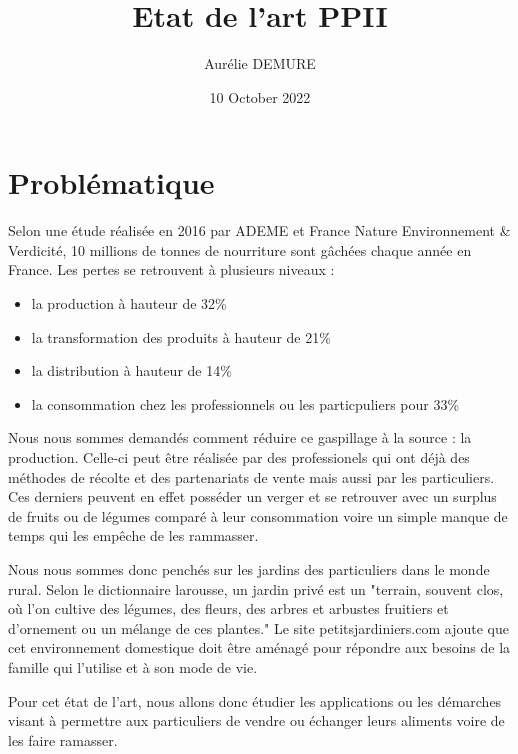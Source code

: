\documentclass{article}
\title{Etat de l'art PPII}
\author{Aurélie DEMURE}
\date{10 October 2022}
\begin{document}
\maketitle

\section{Problématique}

Selon une étude réalisée en 2016 par ADEME et France Nature Environnement
& Verdicité, 10 millions de tonnes de nourriture sont gâchées chaque
année en France. Les pertes se retrouvent à plusieurs niveaux :
\begin{itemize}
    \item la production à hauteur de 32\%
    \item la transformation des produits à hauteur de 21\%
    \item la distribution à hauteur de 14\%
    \item la consommation chez les professionnels ou les particpuliers 
    pour 33\%
\end{itemize}

Nous nous sommes demandés comment réduire ce gaspillage à la source :
la production.
Celle-ci peut être réalisée par des professionels qui ont déjà des 
méthodes de récolte et des partenariats de vente mais aussi par les
particuliers. Ces derniers peuvent en effet posséder un verger et se
retrouver avec un surplus de fruits ou de légumes comparé à leur 
consommation voire un simple manque de temps qui les empêche de les
rammasser. 

Nous nous sommes donc penchés sur les jardins des particuliers dans 
le monde rural. Selon le dictionnaire larousse, un jardin privé est un
"terrain, souvent clos, où l'on cultive des légumes, des fleurs, des 
arbres et arbustes fruitiers et d'ornement ou un mélange de ces plantes."
Le site petitsjardiniers.com ajoute que cet environnement domestique
doit être aménagé pour répondre aux besoins de la famille qui l'utilise
et à son mode de vie.

Pour cet état de l'art, nous allons donc étudier les applications ou les
démarches visant à permettre aux particuliers de vendre ou échanger
leurs aliments voire de les faire ramasser.
\end{document}
